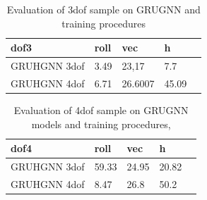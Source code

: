 \begin{table}[h!]
\centering
\caption{Evaluation of 3dof sample on GRUGNN and training procedures} %
\label{tab:pend500}               %
\begin{tabular}{|l|l|l|l|l|}
	\hline
	dof3 & roll & vec & h\\ 
	\hline
	GRUHGNN 3dof & 3.49 & 23,17 & 7.7 \\  
	\hline
	GRUHGNN 4dof & 6.71 & 26.6007 & 45.09 \\  
	\hline
\end{tabular}
\end{table}



\begin{table}[h!]
\centering
\caption{Evaluation of 4dof sample on GRUGNN models and training procedures, } %
\label{tab:pend1000}               %
\begin{tabular}{|l|l|l|l|l|}
	\hline
	dof4 & roll & vec & h\\  
	\hline
	GRUHGNN 3dof & 59.33 & 24.95 & 20.82 \\  
	\hline
	GRUHGNN 4dof & 8.47 & 26.8 & 50.2 \\  
	\hline
\end{tabular}
\end{table}

